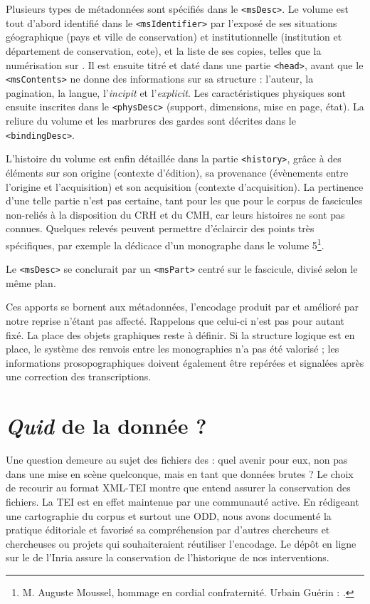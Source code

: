 Plusieurs types de métadonnées sont spécifiés dans le \texttt{<msDesc>}. Le volume est tout d'abord identifié dans le \texttt{<msIdentifier>} par l'exposé de ses situations géographique (pays et ville de conservation) et institutionnelle (institution et département de conservation, cote), et la liste de ses copies, telles que la numérisation sur \ia. Il est ensuite titré et daté dans une partie \texttt{<head>}, avant que le \texttt{<msContents>} ne donne des informations sur sa structure : l'auteur, la pagination, la langue, l'\textit{incipit} et l'\textit{explicit}. Les caractéristiques physiques sont ensuite inscrites dans le \texttt{<physDesc>} (support, dimensions, mise en page, état). La reliure du volume et les marbrures des gardes sont décrites dans le \texttt{<bindingDesc>}.

L'histoire du volume est enfin détaillée dans la partie \texttt{<history>}, grâce à des éléments sur son origine (contexte d'édition), sa provenance (évènements entre l'origine et l'acquisition) et son acquisition (contexte d'acquisition). La pertinence d'une telle partie n'est pas certaine, tant pour les \odm{} que pour le corpus de fascicules non-reliés à la disposition du CRH et du CMH, car leurs histoires ne sont pas connues. Quelques relevés peuvent permettre d'éclaircir des points très spécifiques, par exemple la dédicace d'un monographe dans le volume 5\footnote{\og M. Auguste Moussel, hommage en cordial confraternité. Urbain Guérin \fg{} : \cite{mono083a}.}.

Le \texttt{<msDesc>} se conclurait par un \texttt{<msPart>} centré sur le fascicule, divisé selon le même plan.

Ces apports se bornent aux métadonnées, l'encodage produit par \lse{} et amélioré par notre reprise n'étant pas affecté. Rappelons que celui-ci n'est pas pour autant fixé. La place des objets graphiques reste à définir. Si la structure logique est en place, le système des renvois entre les monographies n'a pas été valorisé ; les informations prosopographiques doivent également être repérées et signalées après une correction des transcriptions.

\section{\textit{Quid} de la donnée ?}

Une question demeure au sujet des fichiers des \odm{} : quel avenir pour eux, non pas dans une mise en scène quelconque, mais en tant que données brutes ? Le choix de recourir au format XML-TEI montre que \timeus{} entend assurer la conservation des fichiers. La TEI est en effet maintenue par une communauté active. En rédigeant une cartographie du corpus et surtout une ODD, nous avons documenté la pratique éditoriale et favorisé sa compréhension par d'autres chercheurs et chercheuses ou projets qui souhaiteraient réutiliser l'encodage. Le dépôt en ligne sur le \gitlab{} de l'Inria assure la conservation de l'historique de nos interventions.

